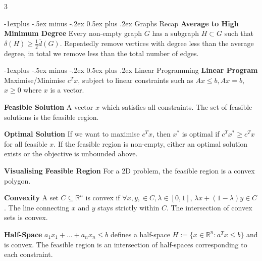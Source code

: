 \documentclass[10pt, landscape]{article}
\makeatletter
\renewcommand{\section}{\@startsection{section}{1}{0mm}%
                                {-1ex plus -.5ex minus -.2ex}%
                                {0.5ex plus .2ex}%
                                {\normalfont\large\bfseries}}
\renewcommand{\section}{\@startsection{section}{2}{0mm}%
                                {-1explus -.5ex minus -.2ex}%
                                {0.5ex plus .2ex}%
                                {\normalfont\normalsize\bfseries}}
\makeatother
\begin{document}
\raggedright
\footnotesize
\begin{multicols*}{3}

\setlength{\columnseprule}{0.25pt}
\setlength{\premulticols}{1pt}
\setlength{\postmulticols}{1pt}
\setlength{\multicolsep}{1pt}
\setlength{\columnsep}{2pt}

\begin{center}
\end{center}

\section{Graphs Recap}
\textbf{Average to High Minimum Degree} Every non-empty graph $G$ has a subgraph $H \subset G$ such that $\delta(H) \geq \frac{1}{2}\overline{d}(G)$. Repeatedly remove vertices with degree less than the average degree, in total we remove less than the total number of edges.

\section{Linear Programming}
\textbf{Linear Program} Maximise/Minimise $c^Tx$, subject to linear constraints such as $Ax \leq b, Ax=b$, $x \geq 0$ where $x$ is a vector.

\textbf{Feasible Solution} A vector $x$ which satisfies all constraints. The set of feasible solutions is the feasible region.

\textbf{Optimal Solution} If we want to maximise $c^Tx$, then $x^*$ is optimal if $c^Tx^* \geq c^Tx$ for all feasible $x$. If the feasible region is non-empty, either an optimal solution exists or the objective is unbounded above.

\textbf{Visualising Feasible Region} For a 2D problem, the feasible region is a convex polygon.

\textbf{Convexity} A set $C \subseteq \mathbb{R}^n$ is convex if $\forall x, y, \in C, \lambda \in [0,1]$, $\lambda x + (1-\lambda)y \in C$. The line connecting $x$ and $y$ stays strictly within $C$. The intersection of convex sets is convex.

\textbf{Half-Space} $a_1x_1+...+a_nx_n \leq b$ defines a half-space $H:=\{x \in \mathbb{R}^n: a^Tx \leq b\}$ and is convex. The feasible region is an intersection of half-spaces corresponding to each constraint.


\end{multicols*}
\end{document}
